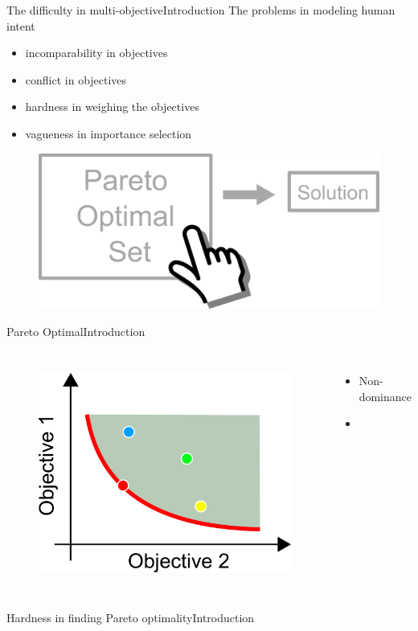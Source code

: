 \begin{frame}{The difficulty in multi-objective}{Introduction}
The problems in modeling human intent
\begin{itemize}
\item incomparability in objectives
\item conflict in objectives
\item hardness in weighing the objectives
\item vagueness in importance selection
\end{itemize}
\begin{figure}
	\centering
	\includegraphics[width=0.6\linewidth]{figure/human_interactive_moo}
	\label{fig:human_interactive_moo}
\end{figure}
\end{frame}

\begin{frame}{Pareto Optimal}{Introduction}
\begin{columns}
	\begin{figure}
		\centering
		\includegraphics[width=\linewidth]{figure/pareto_optimal}
		\label{fig:pareot_optimal}
	\end{figure}
\begin{minipage}{\textwidth}
\begin{itemize}
\item Non-dominance
\item 
\end{itemize}
\end{minipage}
\end{columns}
\end{frame}

\begin{frame}{Hardness in finding Pareto optimality}{Introduction}

\end{frame}